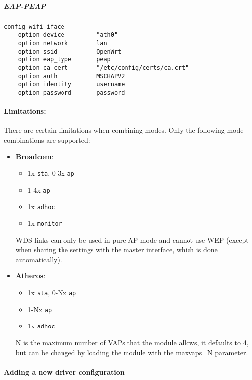 \subparagraph{EAP-PEAP}

\begin{Verbatim}
config wifi-iface
    option device         "ath0"
    option network        lan
    option ssid           OpenWrt
    option eap_type       peap
    option ca_cert        "/etc/config/certs/ca.crt"
    option auth           MSCHAPV2
    option identity       username
    option password       password
\end{Verbatim}

\paragraph{Limitations:}

There are certain limitations when combining modes.
Only the following mode combinations are supported:

\begin{itemize}
    \item \textbf{Broadcom}: \\
        \begin{itemize}
            \item 1x \texttt{sta}, 0-3x \texttt{ap}
            \item 1-4x \texttt{ap}
            \item 1x \texttt{adhoc}
            \item 1x \texttt{monitor}
        \end{itemize}

        WDS links can only be used in pure AP mode and cannot use WEP (except when sharing the
        settings with the master interface, which is done automatically).

    \item \textbf{Atheros}: \\
        \begin{itemize}
            \item 1x \texttt{sta}, 0-Nx \texttt{ap}
            \item 1-Nx \texttt{ap}
            \item 1x \texttt{adhoc}
        \end{itemize}

	N is the maximum number of VAPs that the module allows, it defaults to 4, but can be
	changed by loading the module with the maxvaps=N parameter.
\end{itemize}

\paragraph{Adding a new driver configuration}


